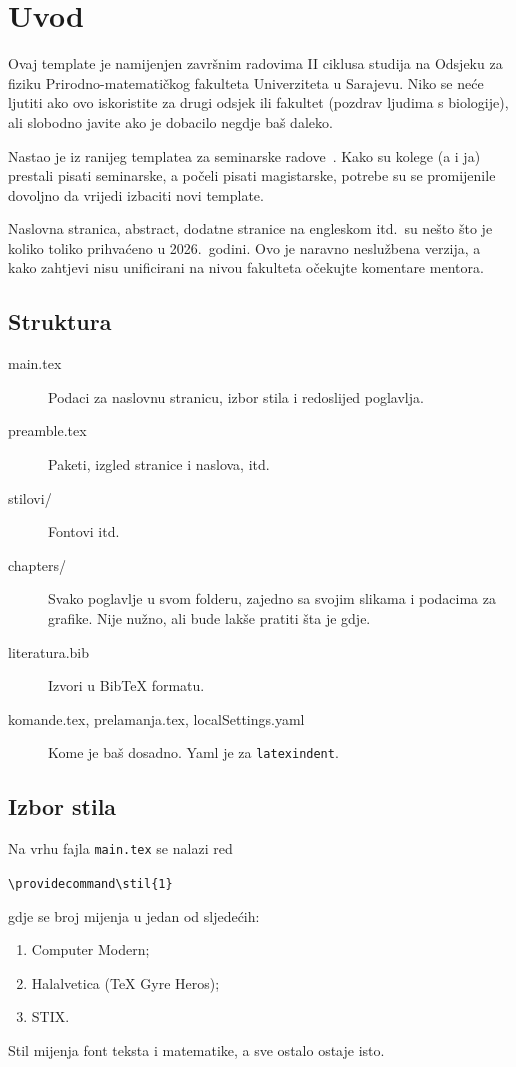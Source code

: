 \chapter{Uvod}
\label{ch:uvod}

Ovaj template je namijenjen završnim radovima II ciklusa studija na Odsjeku za
fiziku Prirodno-matematičkog fakulteta Univerziteta u Sarajevu.
Niko se neće ljutiti ako ovo iskoristite za drugi odsjek ili fakultet (pozdrav
ljudima s biologije), ali slobodno javite ako je dobacilo negdje baš daleko.

Nastao je iz ranijeg templatea za seminarske radove~\cite{git:damir}.
Kako su kolege (a i ja) prestali pisati seminarske, a počeli pisati
magistarske, potrebe su se promijenile dovoljno da vrijedi izbaciti novi
template.

Naslovna stranica, abstract, dodatne stranice na engleskom itd.~su nešto što je
koliko toliko prihvaćeno u 2026.~godini.
Ovo je naravno neslužbena verzija, a kako zahtjevi nisu unificirani na nivou
fakulteta očekujte komentare mentora.

\section{Struktura}

	\begin{description}
		\item[main.tex]
			Podaci za naslovnu stranicu, izbor stila i redoslijed poglavlja.
		\item[preamble.tex]
			Paketi, izgled stranice i naslova, itd.
		\item[stilovi/]
			Fontovi itd.
		\item[chapters/]
			Svako poglavlje u svom folderu, zajedno sa svojim slikama i podacima za
			grafike.
			Nije nužno, ali bude lakše pratiti šta je gdje.
		\item[literatura.bib]
			Izvori u BibTeX formatu.
		\item[komande.tex, prelamanja.tex, localSettings.yaml]
			Kome je baš dosadno.
			Yaml je za \texttt{latexindent}.
	\end{description}

\section{Izbor stila}

	Na vrhu fajla \texttt{main.tex} se nalazi red
	\begin{center}
		\verb+\providecommand\stil{1}+
	\end{center}
	gdje se broj mijenja u jedan od sljedećih:
	\begin{enumerate}
		\item Computer Modern;
		\item Halalvetica (TeX Gyre Heros);
		\item STIX.
	\end{enumerate}
	Stil mijenja font teksta i matematike, a sve ostalo ostaje isto.

